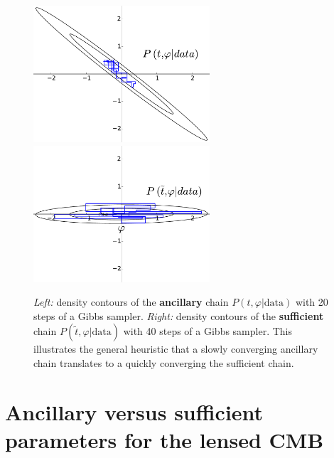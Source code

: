 \documentclass[iop,revtex4,apj,onecolumn]{emulateapj}
\begin{document}
\begin{figure}
\begin{center}
\includegraphics[height=2.0in]{figure1a.pdf}
\includegraphics[height=2.0in]{figure1b.pdf}
\end{center}
\caption{\label{fastslowGibbs}
{\em Left:} density contours of the {\bf ancillary} chain $P( t, \varphi|\text{data})$ with 20 steps of a Gibbs sampler. {\em Right:} density contours of the {\bf sufficient}  chain $P(\widetilde  t, \varphi|\text{data})$ with 40 steps of a Gibbs sampler. This illustrates the general heuristic that a slowly converging ancillary chain translates to a quickly converging the sufficient chain.}
\end{figure}
 


	
%
%
\section{Ancillary versus sufficient parameters for the lensed CMB}
\label{Section: Ancillary and sufficient parameters for the lensed CMB}
\end{document}

